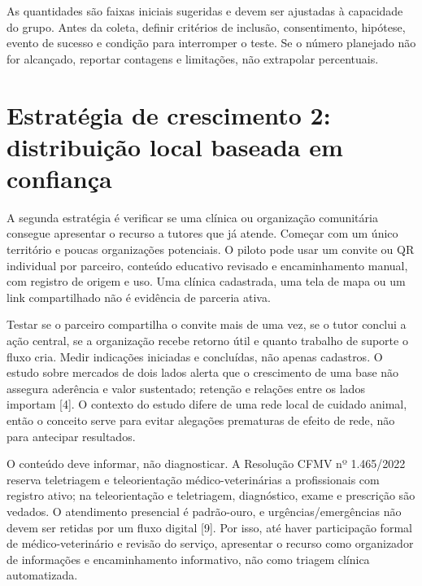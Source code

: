 \documentclass[12pt,a4paper]{article}
\begin{document}
As quantidades são faixas iniciais sugeridas e devem ser ajustadas à capacidade do grupo. Antes da coleta, definir critérios de inclusão, consentimento, hipótese, evento de sucesso e condição para interromper o teste. Se o número planejado não for alcançado, reportar contagens e limitações, não extrapolar percentuais.

\section{Estratégia de crescimento 2: distribuição local baseada em confiança}
A segunda estratégia é verificar se uma clínica ou organização comunitária consegue apresentar o recurso a tutores que já atende. Começar com um único território e poucas organizações potenciais. O piloto pode usar um convite ou QR individual por parceiro, conteúdo educativo revisado e encaminhamento manual, com registro de origem e uso. Uma clínica cadastrada, uma tela de mapa ou um link compartilhado não é evidência de parceria ativa.

Testar se o parceiro compartilha o convite mais de uma vez, se o tutor conclui a ação central, se a organização recebe retorno útil e quanto trabalho de suporte o fluxo cria. Medir indicações iniciadas e concluídas, não apenas cadastros. O estudo sobre mercados de dois lados alerta que o crescimento de uma base não assegura aderência e valor sustentado; retenção e relações entre os lados importam [4]. O contexto do estudo difere de uma rede local de cuidado animal, então o conceito serve para evitar alegações prematuras de efeito de rede, não para antecipar resultados.

O conteúdo deve informar, não diagnosticar. A Resolução CFMV nº 1.465/2022 reserva teletriagem e teleorientação médico-veterinárias a profissionais com registro ativo; na teleorientação e teletriagem, diagnóstico, exame e prescrição são vedados. O atendimento presencial é padrão-ouro, e urgências/emergências não devem ser retidas por um fluxo digital [9]. Por isso, até haver participação formal de médico-veterinário e revisão do serviço, apresentar o recurso como organizador de informações e encaminhamento informativo, não como triagem clínica automatizada.
\end{document}
